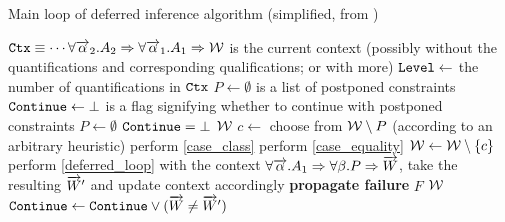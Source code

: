 \begin{algorithm}
    \caption{Main loop of deferred inference algorithm (simplified, from \citet{peytonjones2019type})}
    \label{deferred_loop}
    \begin{algorithmic}
        \Require $\mathtt{Ctx} \equiv \cdots \forall \overrightarrow{\alpha}_2 . A_2 \Rightarrow \forall \overrightarrow{\alpha}_1 . A_1 \Rightarrow \mathcal W$ is the current context (possibly without the quantifications and corresponding qualifications; or with more)
        \State {}
        \State $\mathtt{Level} \gets$ the number of quantifications in $\mathtt{Ctx}$
        \State $P \gets \emptyset$ is a list of postponed constraints
        \State $\mathtt{Continue} \gets \bot$ is a flag signifying whether to continue with postponed constraints
         
             
                 
                    \State $P \gets \emptyset$
                    \State $\mathtt{Continue} = \bot$
                \Else
                    \State \Return $\mathcal W$ 
                \EndIf
            \EndIf
            \State $c \gets $ choose from $\mathcal W \setminus P$ (according to an arbitrary heuristic)
                \State perform \cref{case_class}
                \State perform \cref{case_equality}
                    \State $\mathcal W \gets \mathcal W \setminus \{c\}$ 
                \Else
                    \State perform \cref{deferred_loop} with the context $\forall \overrightarrow{\alpha} . A_1 \Rightarrow \forall \beta . P \Rightarrow \overrightarrow{W}$, take the resulting $\overrightarrow{W}'$ and update context accordingly
                        \State \textbf{propagate failure} $F$
                        \State \Return $\mathcal W$
                    \EndIf
                    \State $\mathtt{Continue} \gets \mathtt{Continue} \lor (\overrightarrow{W} \neq \overrightarrow{W}')$
                \EndIf
            \EndIf
        \EndWhile
    \end{algorithmic}
\end{algorithm}
